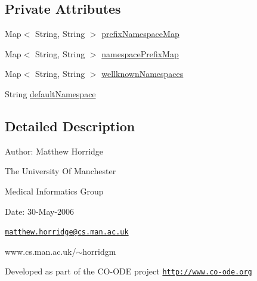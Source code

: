 \subsection*{Private Attributes}
\begin{DoxyCompactItemize}
\item 
Map$<$ String, String $>$ \hyperlink{classorg_1_1coode_1_1xml_1_1_x_m_l_writer_namespace_manager_a4bbd74743172ebf80872d914c3542bcd}{prefix\-Namespace\-Map}
\item 
Map$<$ String, String $>$ \hyperlink{classorg_1_1coode_1_1xml_1_1_x_m_l_writer_namespace_manager_ad64c1116e21ba5a5b953194393b896ff}{namespace\-Prefix\-Map}
\item 
Map$<$ String, String $>$ \hyperlink{classorg_1_1coode_1_1xml_1_1_x_m_l_writer_namespace_manager_aef8ff8e61dfde90b957f474c38fe0b24}{wellknown\-Namespaces}
\item 
String \hyperlink{classorg_1_1coode_1_1xml_1_1_x_m_l_writer_namespace_manager_a25840a2b26dff4709e9406e09809c006}{default\-Namespace}
\end{DoxyCompactItemize}


\subsection{Detailed Description}
Author\-: Matthew Horridge\par
 The University Of Manchester\par
 Medical Informatics Group\par
 Date\-: 30-\/\-May-\/2006\par
\par
 

\href{mailto:matthew.horridge@cs.man.ac.uk}{\tt matthew.\-horridge@cs.\-man.\-ac.\-uk}\par
 www.\-cs.\-man.\-ac.\-uk/$\sim$horridgm\par
\par
 Developed as part of the C\-O-\/\-O\-D\-E project \href{http://www.co-ode.org}{\tt http\-://www.\-co-\/ode.\-org} 

